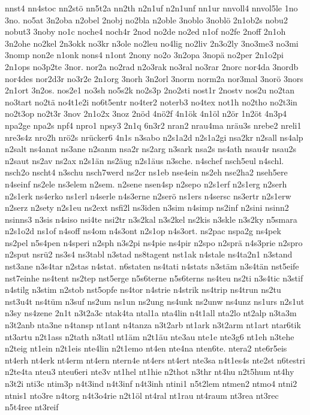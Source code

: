 {nnst4
nn4stoc
nn2stö
nn5t2a
nn2th
n2n1uf
n2n1unf
nn1ur
nnvoll4
nnvol5le
1no
3no.
no5at
3n2oba
n2obel
2nobj
no2bla
n2oble
3noblo
3noblö
2n1ob2s
nobu2
nobut3
3noby
no1c
noche4
noch4r
2nod
no2de
no2ed
n1of
no2fe
2noff
2n1oh
3n2ohe
no2kel
2n3okk
no3kr
n3ole
no2leu
no4lig
no2liv
2n3o2ly
3no3me3
no3mi
3nomp
non2e
n1onk
nons4
n1ont
2nony
no2o
3n2opa
3nopä
no2per
2n1o2pi
2n1ops
no3p2te
3nor.
nor2a
no2rad
n2o3rak
no3ral
no3rar
2norc
nor4da
3nordb
nor4des
nor2d3r
no3r2e
2n1org
3norh
3n2orl
3norm
norm2a
nor3mal
3norö
3nors
2n1ort
3n2os.
nos2e1
no3sh
no5s2k
no2s3p
2no2sti
nost1r
2nostv
nos2u
no2tan
no3tart
no2tä
no4t1e2i
no6t5entr
no4ter2
noterb3
no4tex
not1h
no2tho
no2t3in
no2t3op
no2t3r
3nov
2n1o2x
3noz
2nöd
4nö2f
4n1ök
4n1öl
n2ör
1n2öt
4n3p4
npa2ge
npa2s
npf4
npro1
npsy3
2n1q
6n3r2
nran2
nrau4ma
nräu3s
nrebe2
nreli1
nre3s4z
nro2h
nrö2s
nrücker6
4n1s
n3sabo
n2s1a2d
n2s1a2gi
nsa2kr
n2sall
ns4alp
n2salt
ns4anat
ns3ane
n2sanm
nsa2r
ns2arg
n3sark
nsa2s
ns4ath
nsau4r
nsau2s
n2saut
ns2av
ns2ax
n2s1än
ns2äug
n2s1äus
n3sche.
n4schef
nsch5eul
n4schl.
nsch2o
nscht4
n3schu
nsch7werd
ns2cr
ns1eb
nse4ein
ns2eh
nse2ha2
nseh5ere
n4seinf
ns2ele
ns3elem
n2sem.
n2sene
nsen4sp
n2sepo
n2s1erf
n2s1erg
n2serh
n2s1erk
ns4erko
ns1erl
n4serle
n4s3erne
n2serö
ns1ers
n4sersc
ns3ertr
n2s1erw
n2serz
n2sety
n2s1eu
ns2ext
nsfi2l
ns3iden
n3sim
n4simp
ns2inf
n2sini
nsinn2
nsinns3
n3sis
n4siso
nsi4te
nsi2tr
n3s2kal
n3s2kel
ns2kis
n3skle
n3s2ky
n5smara
n2s1o2d
ns1of
n4soff
ns4om
n4s3ont
n2s1op
n4s3ort.
ns2pac
nspa2g
ns4pek
ns2pel
n5s4pen
n4speri
n2sph
n3s2pi
ns4pie
ns4pir
n2spo
n2sprä
n4s3prie
n2spro
n2sput
nsrü2
ns3s4
ns3tabl
n3stad
ns8tagent
nst1ak
n4stale
ns4ta2n1
n3stand
nst3ane
n3s4tar
n2stas
n4stat.
n6staten
ns4tati
n4stats
n3stäm
n3s4tän
nst5eife
nst7einhe
ns4tent
ns2tep
nst5erge
n5s6terne
n5s6terns
ns4teu
ns2ti
n3s4tic
n3stif
n4stilg
n3stim
n2stob
nst5opfe
ns4tor
n4strie
n4strik
ns4trip
ns4trun
ns2tu
nst3u4t
ns4tüm
n3suf
ns2um
ns1un
ns2ung
ns4unk
ns2unw
ns4unz
ns1urs
n2s1ut
n3sy
ns4zene
2n1t
n3t2a3c
ntak4ta
ntal1a
nta4lin
n4t1all
nta2lo
nt2alp
n3ta3m
n3t2anb
nta3ne
n4tansp
nt1ant
n4tanza
n3t2arb
nt1ark
n3t2arm
nt1art
ntar6tik
nt3artu
n2t1ass
n2tath
n3tatl
nt1äm
n2t1äu
nte3au
nte1e
nte3g6
nt1eh
n3tehe
n2teig
nt1ein
n2t1eis
nte4lin
n2t1emo
nt4en
nte4na
nten6te.
ntera2
nte6r5eis
nt4erh
nt4erk
nt4erm
nt4ern
ntern4e
nt4ers
nt4ert
nte3sa
n4t1es4s
nte2st
n6testri
n2te4ta
nteu3
nteu6eri
nte3v
nt1hel
nt1hie
n2thot
n3thr
nt4hu
n2t5hum
nt4hy
n3t2i
nti3c
ntim3p
n4t3ind
n4t3inf
n4t3inh
ntini1
n5t2lem
ntmen2
ntmo4
ntni2
ntnis1
nto3re
n4torg
n4t3o4rie
n2t1öl
nt4ral
nt1rau
nt4raum
nt3rea
nt3rec
n5t4ree
nt3reif
}
